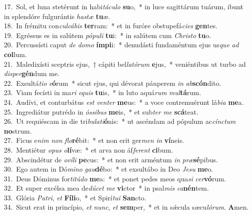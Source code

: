 {17.~}Sol, et luna stetérunt in habi\textit{tá}\textit{cu}\textit{lo} \textbf{su}o,~* in luce sagittárum tuárum, ibunt in splendóre fulgurántis \textit{ha}\textit{stæ} \textbf{tu}æ.\\
{18.~}In frémitu con\textit{cul}\textit{cá}\textit{bis} \textbf{ter}ram:~* et in furóre obstupefá\textit{ci}\textit{es} \textbf{gen}tes.\\
{19.~}Egréssus es in salútem \textit{pó}\textit{pu}\textit{li} \textbf{tu}i:~* in salútem cum \textit{Chri}\textit{sto} \textbf{tu}o.\\
{20.~}Percussísti caput \textit{de} \textit{do}\textit{mo} \textbf{ím}\textbf{pi}i:~* denudásti fundaméntum ejus us\textit{que} \textit{ad} \textbf{col}lum.\\
{21.~}Maledixísti sceptris ejus,~† cápiti bel\textit{la}\textit{tó}\textit{rum} \textbf{e}jus,~* veniéntibus ut turbo ad \textit{di}\textit{sper}\textbf{gén}dum me.\\
{22.~}Exsultá\textit{ti}\textit{o} \textit{e}\textbf{ó}rum~* sicut ejus, qui dévorat páuperem \textit{in} \textit{ab}\textbf{scón}dito.\\
{23.~}Viam fecísti in ma\textit{ri} \textit{e}\textit{quis} \textbf{tu}is,~* in luto aquá\textit{rum} \textit{mul}\textbf{tá}rum.\\
{24.~}Audívi, et conturbátus \textit{est} \textit{ven}\textit{ter} \textbf{me}us:~* a voce contremuérunt lá\textit{bi}\textit{a} \textbf{me}a.\\
{25.~}Ingrediátur putrédo in \textit{ós}\textit{si}\textit{bus} \textbf{me}is,~* et sub\textit{ter} \textit{me} \textbf{scá}teat.\\
{26.~}Ut requiéscam in die tri\textit{bu}\textit{la}\textit{ti}\textbf{ó}nis:~* ut ascéndam ad pópulum ac\textit{cín}\textit{ctum} \textbf{no}strum.\\
{27.~}Ficus e\textit{nim} \textit{non} \textit{flo}\textbf{ré}bit:~* et non erit ger\textit{men} \textit{in} \textbf{ví}neis.\\
{28.~}Mentiétur \textit{o}\textit{pus} \textit{o}\textbf{lí}væ:~* et arva non áf\textit{fe}\textit{rent} \textbf{ci}bum.\\
{29.~}Abscindétur de \textit{o}\textit{ví}\textit{li} \textbf{pe}cus:~* et non erit arméntum \textit{in} \textit{præ}\textbf{sé}pibus.\\
{30.~}Ego autem in Dó\textit{mi}\textit{no} \textit{gau}\textbf{dé}bo:~* et exsultábo in Deo \textit{Je}\textit{su} \textbf{me}o.\\
{31.~}Deus Dóminus for\textit{ti}\textit{tú}\textit{do} \textbf{me}a:~* et ponet pedes meos qua\textit{si} \textit{cer}\textbf{vó}rum.\\
{32.~}Et super excélsa mea de\textit{dú}\textit{cet} \textit{me} \textbf{vi}ctor~* in psal\textit{mis} \textit{ca}\textbf{nén}tem.\\
{33.~}Glória \textit{Pa}\textit{tri}, \textit{et} \textbf{Fí}\textbf{li}o,~* et Spirí\textit{tu}\textit{i} \textbf{San}cto.\\
{34.~}Sicut erat in princípio, \textit{et} \textit{nunc}, \textit{et} \textbf{sem}per,~* et in sǽcula sæcu\textit{ló}\textit{rum}. \textbf{A}men.\\
